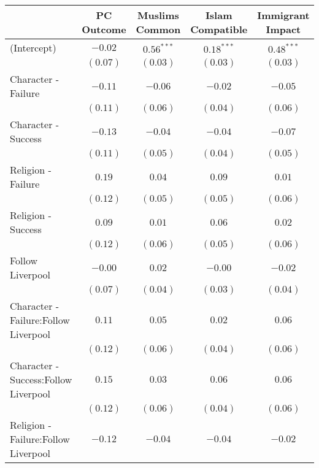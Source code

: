 
\begin{table}[H]
\begin{center}
\begin{footnotesize}
\begin{tabular}{l c c c c}
\hline
 & PC Outcome & Muslims Common & Islam Compatible & Immigrant Impact \\
\hline
(Intercept)                          & $-0.02$  & $0.56^{***}$ & $0.18^{***}$ & $0.48^{***}$ \\
                                     & $(0.07)$ & $(0.03)$     & $(0.03)$     & $(0.03)$     \\
Character - Failure                  & $-0.11$  & $-0.06$      & $-0.02$      & $-0.05$      \\
                                     & $(0.11)$ & $(0.06)$     & $(0.04)$     & $(0.06)$     \\
Character - Success                  & $-0.13$  & $-0.04$      & $-0.04$      & $-0.07$      \\
                                     & $(0.11)$ & $(0.05)$     & $(0.04)$     & $(0.05)$     \\
Religion - Failure                   & $0.19$   & $0.04$       & $0.09$       & $0.01$       \\
                                     & $(0.12)$ & $(0.05)$     & $(0.05)$     & $(0.06)$     \\
Religion - Success                   & $0.09$   & $0.01$       & $0.06$       & $0.02$       \\
                                     & $(0.12)$ & $(0.06)$     & $(0.05)$     & $(0.06)$     \\
Follow Liverpool                     & $-0.00$  & $0.02$       & $-0.00$      & $-0.02$      \\
                                     & $(0.07)$ & $(0.04)$     & $(0.03)$     & $(0.04)$     \\
Character - Failure:Follow Liverpool & $0.11$   & $0.05$       & $0.02$       & $0.06$       \\
                                     & $(0.12)$ & $(0.06)$     & $(0.04)$     & $(0.06)$     \\
Character - Success:Follow Liverpool & $0.15$   & $0.03$       & $0.06$       & $0.06$       \\
                                     & $(0.12)$ & $(0.06)$     & $(0.04)$     & $(0.06)$     \\
Religion - Failure:Follow Liverpool  & $-0.12$  & $-0.04$      & $-0.04$      & $-0.02$      \\

\end{tabular}
\end{footnotesize}
\end{center}
\end{table}
